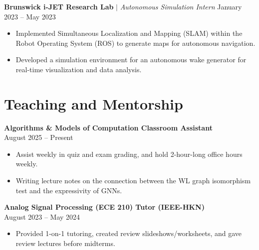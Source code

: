 \documentclass[letterpaper,10pt]{article}
\begin{document}
\textbf{Brunswick i-JET Research Lab} $|$ \textit{Autonomous Simulation Intern} \hfill January 2023 -- May 2023\vspace{-5pt}
\begin{itemize}[itemsep=-5pt, parsep=5pt, leftmargin=0.25in] 
\item Implemented Simultaneous Localization and Mapping (SLAM) within the Robot Operating System (ROS) to generate maps for autonomous navigation.
\item Developed a simulation environment for an autonomous wake generator for real-time visualization and data analysis. 
\end{itemize}


\section{Teaching and Mentorship}
    \textbf{Algorithms \& Models of Computation Classroom Assistant}\\ August 2025 -- Present\vspace{-5pt}
    \begin{itemize}[itemsep=-5pt, parsep=5pt, leftmargin=0.25in]
        \item Assist weekly in quiz and exam grading, and hold 2-hour-long office hours weekly.
        \item Writing lecture notes on the connection between the WL graph isomorphism test and the expressivity of GNNs.
    \end{itemize}
    \textbf{Analog Signal Processing (ECE 210) Tutor (IEEE-HKN)}\\ August 2023 -- May 2024\vspace{-5pt}
    \begin{itemize}[itemsep=-5pt, parsep=5pt, leftmargin=0.25in]
        \item Provided 1-on-1 tutoring, created review slideshows/worksheets, and gave review lectures before midterms.
    \end{itemize}
    
\end{document}
